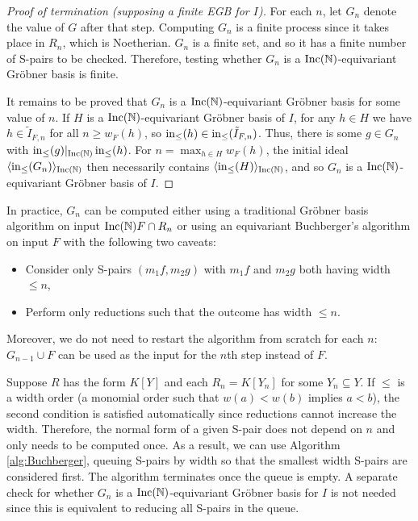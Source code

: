 \begin{proof}[Proof of termination (supposing a finite EGB for $I$)]
For each $n$, let $G_n$ denote the value of $G$ after that step.  Computing $G_n$ is a finite process since it takes place in $R_n$, which is Noetherian.  $G_n$ is a finite set, and so it has a finite number of S-pairs to be checked.  Therefore, testing whether $G_n$ is a $\operatorname{Inc}(\mathbb N)$-equivariant Gr\"obner basis is finite.

It remains to be proved that $G_n$ is a $\operatorname{Inc}(\mathbb N)$-equivariant Gr\"obner basis for some value of $n$.  If $H$ is a $\operatorname{Inc}(\mathbb N)$-equivariant Gr\"obner basis of $I$, for any $h \in H$ we have $h \in \tilde{I}_{F,n}$ for all $n \geq w_F(h)$, so $\operatorname{in}_{\leq}(h) \in \operatorname{in}_{\leq}(\tilde{I}_{F,n})$.  Thus, there is some $g \in G_n$ with $\operatorname{in}_{\leq}(g)|_{\operatorname{Inc}(\mathbb N)} \operatorname{in}_{\leq}(h)$.  For $n = \max_{h\in H} w_F(h)$, the initial ideal $\langle \operatorname{in}_{\leq}(G_n) \rangle_{\operatorname{Inc}(\mathbb N)}$ then necessarily contains $\langle \operatorname{in}_{\leq}(H) \rangle_{\operatorname{Inc}(\mathbb N)}$, and so $G_n$ is a $\operatorname{Inc}(\mathbb N)$-equivariant Gr\"obner basis of $I$.
\end{proof}

In practice, $G_n$ can be computed either using a traditional Gr\"obner basis algorithm on input $\operatorname{Inc}(\mathbb N) F \cap R_n$ or using an equivariant Buchberger's algorithm on input $F$ with the following two caveats:
\begin{itemize}
 \item Consider only S-pairs $(m_1f, m_2g)$ with $m_1f$ and $m_2g$ both having width $\leq n$,
 \item Perform only reductions such that the outcome has width $\leq n$.
\end{itemize}
Moreover, we do not need to restart the algorithm from scratch for each $n$: $G_{n-1} \cup F$ can be used as the input for the $n$th step instead of $F$.

Suppose $R$ has the form $K[Y]$ and each $R_n = K[Y_n]$ for some $Y_n \subseteq Y$.  If $\leq$ is a width order (a monomial order such that $w(a) < w(b)$ implies $a < b$), the second condition is satisfied automatically since reductions cannot increase the width.  Therefore, the normal form of a given S-pair does not depend on $n$ and only needs to be computed once.  As a result, we can use Algorithm \ref{alg:Buchberger}, queuing S-pairs by width so that the smallest width S-pairs are considered first.  The algorithm terminates once the queue is empty.  A separate check for whether $G_n$ is a $\operatorname{Inc}(\mathbb N)$-equivariant Gr\"obner basis for $I$ is not needed since this is equivalent to reducing all S-pairs in the queue.

